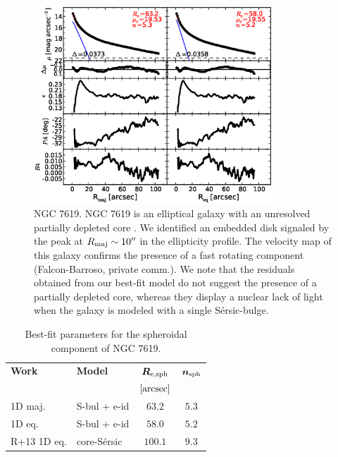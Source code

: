 \documentclass[preprint2]{emulateapj}
\newcommand{\fitfigurewidth}{0.8\textwidth}
\begin{document}
  \begin{figure}[h]
  \begin{center}
  \includegraphics[width=\fitfigurewidth]{images/n7619_1Dfit.eps}
  \caption{NGC 7619.
  NGC 7619 is an elliptical galaxy with an unresolved partially depleted core \citep{rusli2013}. %
  We identified an embedded disk signaled by the peak at $R_{\rm maj} \sim 10''$ in the ellipticity profile.
  The velocity map of this galaxy confirms the presence of a fast rotating component (Falcon-Barroso, private comm.).
  We note that the residuals obtained from our best-fit model do not suggest the presence of a partially depleted core,
  whereas they display a nuclear lack of light when the galaxy is modeled with a single S\'ersic-bulge. 
  }
  \end{center}
  \end{figure}

  \begin{table}[h]
  \small
  \caption{Best-fit parameters for the spheroidal component of NGC 7619.}
  \begin{center}
  \begin{tabular}{llcc}
  \hline
  {\bf Work} & {\bf Model}   & $\bm R_{\rm e,sph}$    & $\bm n_{\rm sph}$ \\
    &  &  $[\rm arcsec]$ & \\
  \hline
  1D maj. & S-bul + e-id & $63.2$  &  $5.3$ \\
  1D eq.  & S-bul + e-id & $58.0$  &  $5.2$ \\
  \hline
  R+13 1D eq.      & core-S\'ersic & $100.1$  &  $9.3$ \\
  \hline
  \end{tabular}
  \end{center}
  \label{tab:n7619}
  \end{table}
\end{document}
